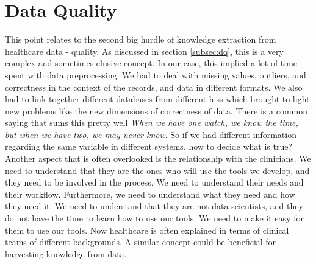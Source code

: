 \section{Data Quality}
This point relates to the second big hurdle of knowledge extraction from healthcare data - quality. As discussed in section \ref{subsec:dq}, this is a very complex and sometimes elusive concept. In our case, this implied a lot of time spent with data preprocessing. We had to deal with missing values, outliers, and correctness in the context of the records, and data in different formats. We also had to link together different databases from different \acp{his} which brought to light new problems like the new dimensions of correctness of data. There is a common saying that sums this pretty well \textit{When we have one watch, we know the time, but when we have two, we may never know}. So if we had different information regarding the same variable in different systems, how to decide what is true?
Another aspect that is often overlooked is the relationship with the clinicians. We need to understand that they are the ones who will use the tools we develop, and they need to be involved in the process. We need to understand their needs and their workflow. Furthermore, we need to understand what they need and how they need it. We need to understand that they are not data scientists, and they do not have the time to learn how to use our tools. We need to make it easy for them to use our tools. Now healthcare is often explained in terms of clinical teams of different backgrounds. A similar concept could be beneficial for harvesting knowledge from data.


